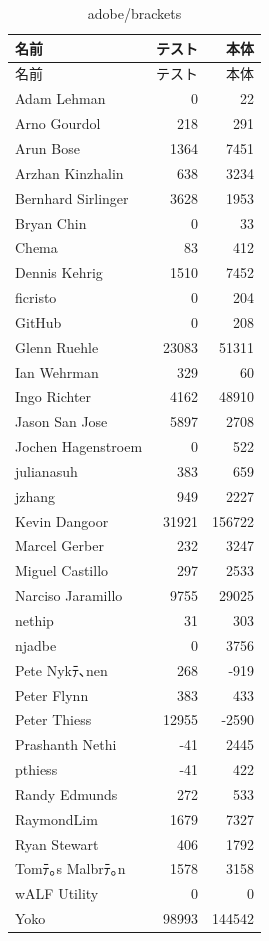 \begin{table}[htb]
\begin{center}
\caption{adobe/brackets}
\begin{tabular}{|l|r|r|} \hline 
名前 & テスト & 本体 \\ \hline \hline
名前 & テスト & 本体\\ \hline
Adam Lehman & 0 & 22\\ \hline
Arno Gourdol & 218 & 291\\ \hline
Arun Bose & 1364 & 7451\\ \hline
Arzhan Kinzhalin & 638 & 3234\\ \hline
Bernhard Sirlinger & 3628 & 1953\\ \hline
Bryan Chin & 0 & 33\\ \hline
Chema & 83 & 412\\ \hline
Dennis Kehrig & 1510 & 7452\\ \hline
ficristo & 0 & 204\\ \hline
GitHub & 0 & 208\\ \hline
Glenn Ruehle & 23083 & 51311\\ \hline
Ian Wehrman & 329 & 60\\ \hline
Ingo Richter & 4162 & 48910\\ \hline
Jason San Jose & 5897 & 2708\\ \hline
Jochen Hagenstroem & 0 & 522\\ \hline
julianasuh & 383 & 659\\ \hline
jzhang & 949 & 2227\\ \hline
Kevin Dangoor & 31921 & 156722\\ \hline
Marcel Gerber & 232 & 3247\\ \hline
Miguel Castillo & 297 & 2533\\ \hline
Narciso Jaramillo & 9755 & 29025\\ \hline
nethip & 31 & 303\\ \hline
njadbe & 0 & 3756\\ \hline
Pete Nykﾃ､nen & 268 & -919\\ \hline
Peter Flynn & 383 & 433\\ \hline
Peter Thiess & 12955 & -2590\\ \hline
Prashanth Nethi & -41 & 2445\\ \hline
pthiess & -41 & 422\\ \hline
Randy Edmunds & 272 & 533\\ \hline
RaymondLim & 1679 & 7327\\ \hline
Ryan Stewart & 406 & 1792\\ \hline
Tomﾃ｡s Malbrﾃ｡n & 1578 & 3158\\ \hline
wALF Utility & 0 & 0\\ \hline
Yoko & 98993 & 144542\\ \hline
\end{tabular}
\end{center}
\end{table}

